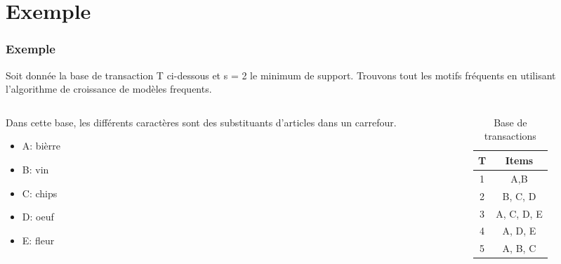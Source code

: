\documentclass{beamer}
\begin{document}
\section[Exemple]{Exemple}
\frame
{
  \frametitle{Exemple}
  {\small Soit donnée la base de transaction T ci-dessous et s = 2 le minimum de support. Trouvons tout les motifs fréquents en utilisant l'algorithme de croissance de modèles frequents.}

\begin{columns} 
   {\small  \begin{column}{.5\textwidth}
        Dans cette base, les différents caractères sont des substituants d'articles dans un carrefour.\cite{towardsdatascience}
     	  \begin{itemize}
 		 \item<1-> A: bièrre
		 \item<1-> B: vin
		 \item<1-> C: chips
		 \item<1-> D: oeuf
		 \item<1-> E: fleur
  	\end{itemize}
    \end{column}
    \begin{column}{.5\textwidth}
  			\begin{table}[htp]
			\caption{Base de transactions}
			\begin{center}
				\begin{tabular}{|c|c|}
				\hline
				\textbf{T} & \textbf{Items} \\
				\hline
				1 & A,B \\
				\hline
				2 & B, C, D \\
				\hline
				3 & A, C, D, E \\
				\hline
				4 & A, D, E \\
				\hline
				5 & A, B, C \\
				\hline
				\end{tabular}
			\end{center}
			\label{Base de transactions}
			\end{table}%
    \end{column}%
   }
\end{columns}  

  }
  
\end{document}
